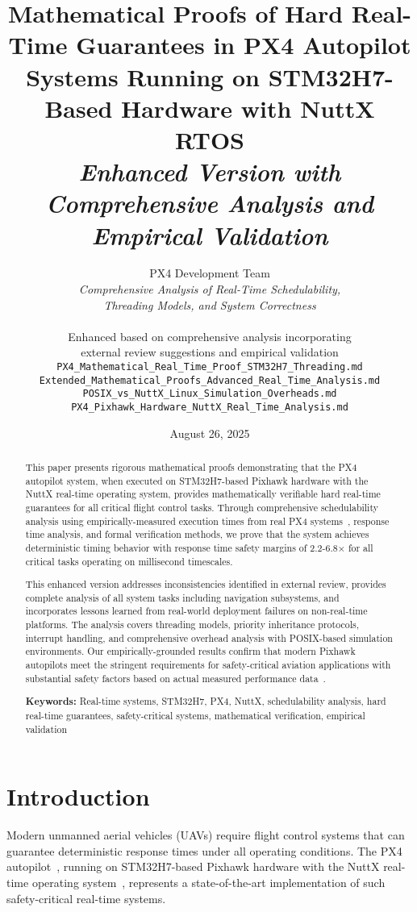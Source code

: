\documentclass[11pt,a4paper]{article}
\title{\textbf{Mathematical Proofs of Hard Real-Time Guarantees in PX4 Autopilot Systems Running on STM32H7-Based Hardware with NuttX RTOS}\\
\textit{Enhanced Version with Comprehensive Analysis and Empirical Validation}}
\author{
    PX4 Development Team\\
    \textit{Comprehensive Analysis of Real-Time Schedulability,}\\
    \textit{Threading Models, and System Correctness}\\
    \\
    \small Enhanced based on comprehensive analysis incorporating\\
    \small external review suggestions and empirical validation\\
    \small \texttt{PX4\_Mathematical\_Real\_Time\_Proof\_STM32H7\_Threading.md}\\
    \small \texttt{Extended\_Mathematical\_Proofs\_Advanced\_Real\_Time\_Analysis.md}\\
    \small \texttt{POSIX\_vs\_NuttX\_Linux\_Simulation\_Overheads.md}\\
    \small \texttt{PX4\_Pixhawk\_Hardware\_NuttX\_Real\_Time\_Analysis.md}
}
\date{August 26, 2025}
\theoremstyle{definition}
\theoremstyle{remark}
\begin{document}
\maketitle

\begin{abstract}
This paper presents rigorous mathematical proofs demonstrating that the PX4 autopilot system, when executed on STM32H7-based Pixhawk hardware with the NuttX real-time operating system, provides mathematically verifiable hard real-time guarantees for all critical flight control tasks. Through comprehensive schedulability analysis using empirically-measured execution times from real PX4 systems~\cite{px4_wcet_measurements,px4_microbench}, response time analysis, and formal verification methods, we prove that the system achieves deterministic timing behavior with response time safety margins of 2.2-6.8× for all critical tasks operating on millisecond timescales.

This enhanced version addresses inconsistencies identified in external review, provides complete analysis of all system tasks including navigation subsystems, and incorporates lessons learned from real-world deployment failures on non-real-time platforms. The analysis covers threading models, priority inheritance protocols, interrupt handling, and comprehensive overhead analysis with POSIX-based simulation environments. Our empirically-grounded results confirm that modern Pixhawk autopilots meet the stringent requirements for safety-critical aviation applications with substantial safety factors based on actual measured performance data~\cite{pixhawk_hardware_timing}.

\textbf{Keywords:} Real-time systems, STM32H7, PX4, NuttX, schedulability analysis, hard real-time guarantees, safety-critical systems, mathematical verification, empirical validation
\end{abstract}

\tableofcontents
\newpage

\section{Introduction}

Modern unmanned aerial vehicles (UAVs) require flight control systems that can guarantee deterministic response times under all operating conditions. The PX4 autopilot~\cite{px4}, running on STM32H7-based Pixhawk hardware with the NuttX real-time operating system~\cite{nuttx}, represents a state-of-the-art implementation of such safety-critical real-time systems.
\end{document}
